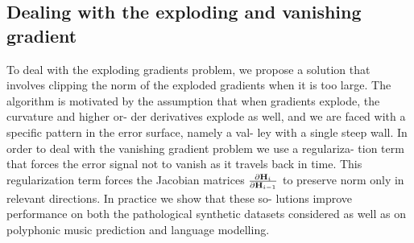 \documentclass{article}
\begin{document}
\subsection{Dealing with the exploding and
vanishing gradient}
To deal with the exploding gradients
problem, we propose a solution that involves clipping
the norm of the exploded gradients when it is too large.
The algorithm is motivated by the assumption that
when gradients explode, the curvature and higher or-
der derivatives explode as well, and we are faced with
a specific pattern in the error surface, namely a val-
ley with a single steep wall. In order to deal with
the vanishing gradient problem we use a regulariza-
tion term that forces the error signal not to vanish as
it travels back in time. This regularization term forces
the Jacobian matrices $\pdv{\mathbf{H}_i}{\mathbf{H}_{i-1}}$ to preserve norm only in
relevant directions. In practice we show that these so-
lutions improve performance on both the pathological
synthetic datasets considered as well as on polyphonic
music prediction and language modelling.
\end{document}
